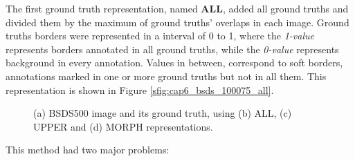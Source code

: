 The first ground truth representation, named \textbf{ALL}, added all ground truths and divided them by the maximum of ground truths' overlaps in each image.
Ground truths borders were represented in a interval of 0 to 1, where the \textit{1-value} represents borders annotated in all ground truths, while the \textit{0-value} represents background in every annotation.
Values in between, correspond to soft borders, annotations marked in one or more ground truths but not in all them.
This representation is shown in Figure \ref{sfig:cap6_bsds_100075_all}.

\begin{figure}%
  \centering
  \hfill
  \hfill
  \hfill
  \caption{(a) BSDS500 image and its ground truth, using (b) ALL, (c) UPPER and (d) MORPH representations.}
  \label{fig:cap6_bsds_all}
\end{figure}

This method had two major problems:

